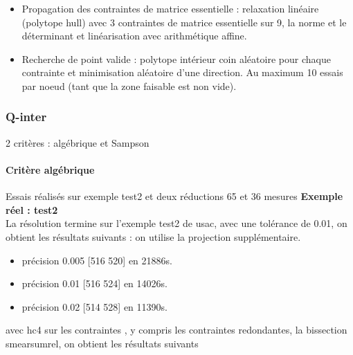 \documentclass{article}
\begin{document}
\begin{itemize}
\item {Propagation des contraintes de matrice essentielle} :  relaxation lin\'eaire (polytope hull) avec 3 contraintes de matrice essentielle sur 9, la norme et le d\'eterminant et lin\'earisation avec arithm\'etique affine. 

\item{Recherche de point valide} : polytope int\'erieur  coin al\'eatoire pour chaque contrainte et  minimisation al\'eatoire d'une direction. Au maximum 10 essais par noeud  (tant que la zone faisable est non vide).

\end{itemize}


\subsubsection{Q-inter}

2 crit\`eres  :  alg\'ebrique et Sampson

\paragraph{Crit\`ere alg\'ebrique} 

Essais r\'ealis\'es sur exemple test2  et deux r\'eductions 65 et 36 mesures
{\bf Exemple r\'eel : test2}\\

La  r\'esolution termine sur l'exemple test2 de usac,  avec une tol\'erance de 0.01, on obtient les r\'esultats suivants :
on utilise la projection  suppl\'ementaire.
\begin{itemize}
\item  pr\'ecision 0.005  [516 520] en  21886s.

\item pr\'ecision 0.01  [516 524] en  14026s.

\item pr\'ecision 0.02  [514 528] en 11390s.

\end{itemize}

avec hc4 sur les contraintes , y compris les contraintes redondantes, la bissection smearsumrel,  on 
obtient les r\'esultats suivants 
\end{document}
